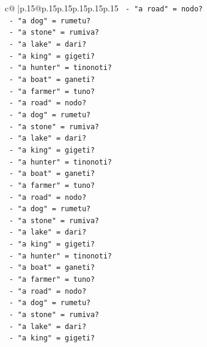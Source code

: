 \documentclass{article}
\begin{document}
{\begin{supertabular}{c@{$\;$}|p{.15\linewidth}@{}p{.15\linewidth}p{.15\linewidth}p{.15\linewidth}p{.15\linewidth}p{.15\linewidth}}
{{{\texttt{                {-} "a road" = nodo?} \\
\texttt{                {-} "a dog" = rumetu?} \\
\texttt{                {-} "a stone" = rumiva?} \\
\texttt{                {-} "a lake" = dari?} \\
\texttt{                {-} "a king" = gigeti?} \\
\texttt{                {-} "a hunter" = tinonoti?} \\
\texttt{                {-} "a boat" = ganeti?} \\
\texttt{                {-} "a farmer" = tuno?} \\
\texttt{                {-} "a road" = nodo?} \\
\texttt{                {-} "a dog" = rumetu?} \\
\texttt{                {-} "a stone" = rumiva?} \\
\texttt{                {-} "a lake" = dari?} \\
\texttt{                {-} "a king" = gigeti?} \\
\texttt{                {-} "a hunter" = tinonoti?} \\
\texttt{                {-} "a boat" = ganeti?} \\
\texttt{                {-} "a farmer" = tuno?} \\
\texttt{                {-} "a road" = nodo?} \\
\texttt{                {-} "a dog" = rumetu?} \\
\texttt{                {-} "a stone" = rumiva?} \\
\texttt{                {-} "a lake" = dari?} \\
\texttt{                {-} "a king" = gigeti?} \\
\texttt{                {-} "a hunter" = tinonoti?} \\
\texttt{                {-} "a boat" = ganeti?} \\
\texttt{                {-} "a farmer" = tuno?} \\
\texttt{                {-} "a road" = nodo?} \\
\texttt{                {-} "a dog" = rumetu?} \\
\texttt{                {-} "a stone" = rumiva?} \\
\texttt{                {-} "a lake" = dari?} \\
\texttt{                {-} "a king" = gigeti?} \\
}}}
\end{supertabular}}
\end{document}
